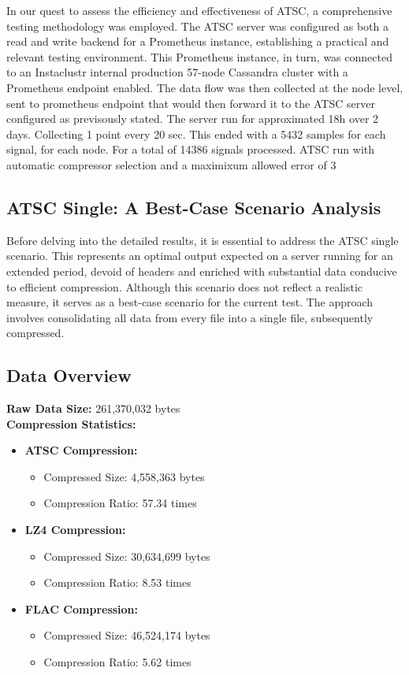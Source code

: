 \documentclass[conference]{IEEEtran}
\begin{document}
In our quest to assess the efficiency and effectiveness of ATSC, a comprehensive testing methodology was employed. The ATSC server was configured as both a read and write backend for a Prometheus instance, establishing a practical and relevant testing environment. This Prometheus instance, in turn, was connected to an Instaclustr internal production 57-node Cassandra cluster with a Prometheus endpoint enabled. 
The data flow was then collected at the node level, sent to prometheus endpoint that would then forward it to the ATSC server configured as previsously stated.
The server run for approximated 18h over 2 days. Collecting 1 point every 20 sec. This ended with a 5432 samples for each signal, for each node. For a total of 14386 signals processed.
ATSC run with automatic compressor selection and a maximixum allowed error of 3\\%

\subsection*{ATSC Single: A Best-Case Scenario Analysis}

Before delving into the detailed results, it is essential to address the ATSC single scenario. This represents an optimal output expected on a server running for an extended period, devoid of headers and enriched with substantial data conducive to efficient compression. Although this scenario does not reflect a realistic measure, it serves as a best-case scenario for the current test. The approach involves consolidating all data from every file into a single file, subsequently compressed.

\subsection*{Data Overview}

\textbf{Raw Data Size:} 261,370,032 bytes \\
\textbf{Compression Statistics:}

\begin{itemize}
    \item \textbf{ATSC Compression:}
    \begin{itemize}
        \item Compressed Size: 4,558,363 bytes
        \item Compression Ratio: 57.34 times
    \end{itemize}
    \item \textbf{LZ4 Compression:}
    \begin{itemize}
        \item Compressed Size: 30,634,699 bytes
        \item Compression Ratio: 8.53 times
    \end{itemize}
    \item \textbf{FLAC Compression:}
    \begin{itemize}
        \item Compressed Size: 46,524,174 bytes
        \item Compression Ratio: 5.62 times
    \end{itemize}
\end{itemize}
\end{document}
